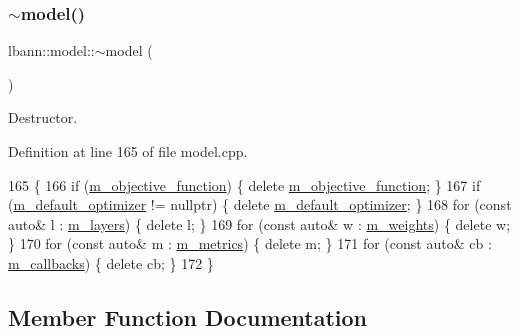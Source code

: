 \subsubsection{\texorpdfstring{$\sim$model()}{~model()}}
{\footnotesize\ttfamily lbann\+::model\+::$\sim$model (\begin{DoxyParamCaption}{ }\end{DoxyParamCaption})\hspace{0.3cm}{\ttfamily [virtual]}}

Destructor. 

Definition at line 165 of file model.\+cpp.


\begin{DoxyCode}
165               \{
166   \textcolor{keywordflow}{if} (\hyperlink{classlbann_1_1model_a24c50e7108dd7698671aed7df5b22e8b}{m\_objective\_function})           \{ \textcolor{keyword}{delete} 
      \hyperlink{classlbann_1_1model_a24c50e7108dd7698671aed7df5b22e8b}{m\_objective\_function}; \}
167   \textcolor{keywordflow}{if} (\hyperlink{classlbann_1_1model_a68df9efe547f53f7bf2a03ac64527990}{m\_default\_optimizer} != \textcolor{keyword}{nullptr}) \{ \textcolor{keyword}{delete} 
      \hyperlink{classlbann_1_1model_a68df9efe547f53f7bf2a03ac64527990}{m\_default\_optimizer}; \}
168   \textcolor{keywordflow}{for} (\textcolor{keyword}{const} \textcolor{keyword}{auto}& l : \hyperlink{classlbann_1_1model_a0229fc226ec163d1411548446104569d}{m\_layers})      \{ \textcolor{keyword}{delete} l; \}
169   \textcolor{keywordflow}{for} (\textcolor{keyword}{const} \textcolor{keyword}{auto}& w : \hyperlink{classlbann_1_1model_aaf9adefe4497d90bf5bc2567e71bfb00}{m\_weights})     \{ \textcolor{keyword}{delete} w; \}
170   \textcolor{keywordflow}{for} (\textcolor{keyword}{const} \textcolor{keyword}{auto}& m : \hyperlink{classlbann_1_1model_ae75c9aafe9e5a93980cc1bbae986bc79}{m\_metrics})     \{ \textcolor{keyword}{delete} m; \}
171   \textcolor{keywordflow}{for} (\textcolor{keyword}{const} \textcolor{keyword}{auto}& cb : \hyperlink{classlbann_1_1model_a07b511fef30368494c2ad80922ffd0eb}{m\_callbacks})  \{ \textcolor{keyword}{delete} cb; \}
172 \}
\end{DoxyCode}


\subsection{Member Function Documentation}
\mbox{\label{classlbann_1_1model_a8f45cdca82dbc0cc1f519898474cc6ec}} 
